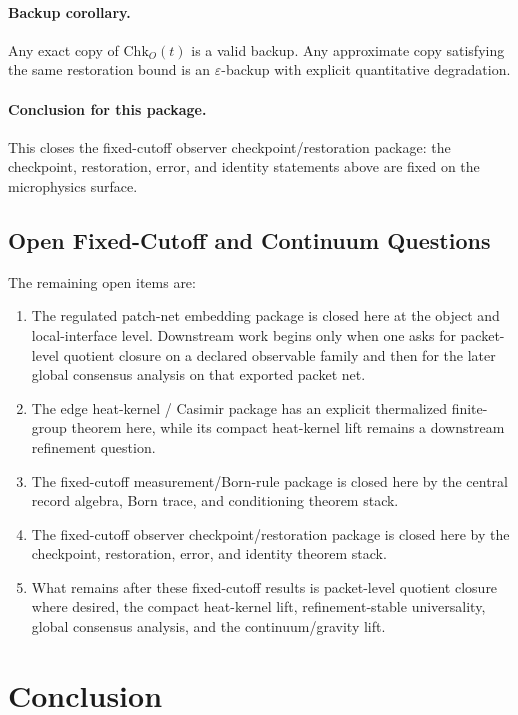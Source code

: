 \documentclass[11pt]{article}
\begin{document}
\paragraph{Backup corollary.}
Any exact copy of $\mathrm{Chk}_O(t)$ is a valid backup. Any approximate copy satisfying the
same restoration bound is an $\varepsilon$-backup with explicit quantitative degradation.

\paragraph{Conclusion for this package.}
This closes the fixed-cutoff observer checkpoint/restoration package: the checkpoint, restoration, error, and identity statements above are fixed on the microphysics surface.

\subsection{Open Fixed-Cutoff and Continuum Questions}

The remaining open items are:
\begin{enumerate}[leftmargin=2em]
\item The regulated patch-net embedding package is closed here at the object and local-interface
level. Downstream work begins only when one asks for packet-level quotient closure on a declared
observable family and then for the later global consensus analysis on that exported packet net.
\item The edge heat-kernel / Casimir package has an explicit thermalized finite-group theorem
here, while its compact heat-kernel lift remains a downstream refinement question.
\item The fixed-cutoff measurement/Born-rule package is closed here by the central record
algebra, Born trace, and conditioning theorem stack.
\item The fixed-cutoff observer checkpoint/restoration package is closed here by the
checkpoint, restoration, error, and identity theorem stack.
\item What remains after these fixed-cutoff results is packet-level quotient closure where
desired, the compact heat-kernel lift, refinement-stable universality, global consensus analysis,
and the continuum/gravity lift.
\end{enumerate}

\section{Conclusion}
\end{document}
